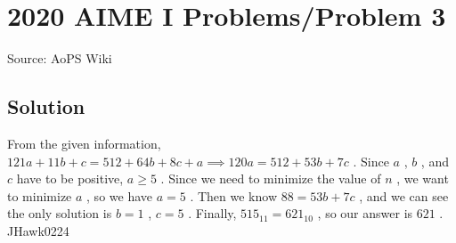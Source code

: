 \documentclass[12pt]{article}
\begin{document}
\section*{{2020 AIME I Problems/Problem 3}}
Source: AoPS Wiki

\subsection*{Solution}
From the given information, $121a+11b+c=512+64b+8c+a \implies 120a=512+53b+7c$ . Since $a$ , $b$ , and $c$ have to be positive, $a \geq 5$ . Since we need to minimize the value of $n$ , we want to minimize $a$ , so we have $a = 5$ . Then we know $88=53b+7c$ , and we can see the only solution is $b=1$ , $c=5$ . Finally, $515_{11} = 621_{10}$ , so our answer is $\boxed{621}$ . ~ JHawk0224
\end{document}

